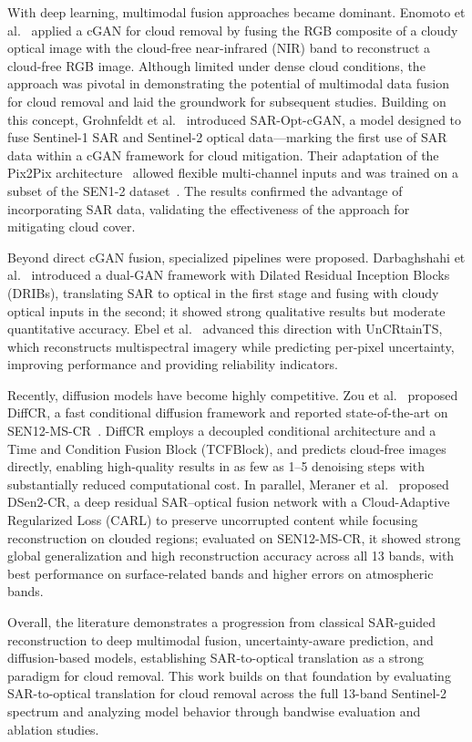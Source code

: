 With deep learning, multimodal fusion approaches became dominant. Enomoto et al.~\cite{filmy_cloudy_NIR_Enomoto} applied a cGAN for cloud removal by fusing the RGB composite of a cloudy optical image with the cloud-free near-infrared (NIR) band to reconstruct a cloud-free RGB image. Although limited under dense cloud conditions, the approach was pivotal in demonstrating the potential of multimodal data fusion for cloud removal and laid the groundwork for subsequent studies. Building on this concept, Grohnfeldt et al.~\cite{A_cGAN_fuse_sar_MS_CR} introduced SAR-Opt-cGAN, a model designed to fuse Sentinel-1 SAR and Sentinel-2 optical data—marking the first use of SAR data within a cGAN framework for cloud mitigation. Their adaptation of the Pix2Pix architecture~\cite{pix2pix_2018} allowed flexible multi-channel inputs and was trained on a subset of the SEN1-2 dataset~\cite{sen12_2018}. The results confirmed the advantage of incorporating SAR data, validating the effectiveness of the approach for mitigating cloud cover.

Beyond direct cGAN fusion, specialized pipelines were proposed. Darbaghshahi et al.~\cite{CR_RS_GAN_s2o} introduced a dual-GAN framework with Dilated Residual Inception Blocks (DRIBs), translating SAR to optical in the first stage and fusing with cloudy optical inputs in the second; it showed strong qualitative results but moderate quantitative accuracy. Ebel et al.~\cite{UnCRtainTS} advanced this direction with UnCRtainTS, which reconstructs multispectral imagery while predicting per-pixel uncertainty, improving performance and providing reliability indicators.

Recently, diffusion models have become highly competitive. Zou et al.~\cite{DiffCR} proposed DiffCR, a fast conditional diffusion framework and reported state-of-the-art on SEN12-MS-CR~\cite{sen12ms-cr_2021}. DiffCR employs a decoupled conditional architecture and a Time and Condition Fusion Block (TCFBlock), and predicts cloud-free images directly, enabling high-quality results in as few as 1–5 denoising steps with substantially reduced computational cost. In parallel, Meraner et al.~\cite{CR_SEN2_dRNN} proposed DSen2-CR, a deep residual SAR–optical fusion network with a Cloud-Adaptive Regularized Loss (CARL) to preserve uncorrupted content while focusing reconstruction on clouded regions; evaluated on SEN12-MS-CR, it showed strong global generalization and high reconstruction accuracy across all 13 bands, with best performance on surface-related bands and higher errors on atmospheric bands.

Overall, the literature demonstrates a progression from classical SAR-guided reconstruction to deep multimodal fusion, uncertainty-aware prediction, and diffusion-based models, establishing SAR-to-optical translation as a strong paradigm for cloud removal. This work builds on that foundation by evaluating SAR-to-optical translation for cloud removal across the full 13-band Sentinel-2 spectrum and analyzing model behavior through bandwise evaluation and ablation studies.
